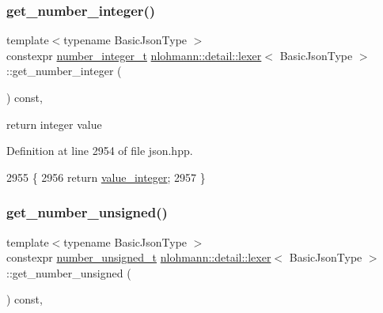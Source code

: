 \subsubsection{\texorpdfstring{get\+\_\+number\+\_\+integer()}{get\_number\_integer()}}
{\footnotesize\ttfamily template$<$typename Basic\+Json\+Type $>$ \\
constexpr \hyperlink{classnlohmann_1_1detail_1_1lexer_a9cd1b11cc67edbfb2613c788b5bd337c}{number\+\_\+integer\+\_\+t} \hyperlink{classnlohmann_1_1detail_1_1lexer}{nlohmann\+::detail\+::lexer}$<$ Basic\+Json\+Type $>$\+::get\+\_\+number\+\_\+integer (\begin{DoxyParamCaption}{ }\end{DoxyParamCaption}) const\hspace{0.3cm}{\ttfamily [inline]}, {\ttfamily [noexcept]}}



return integer value 



Definition at line 2954 of file json.\+hpp.


\begin{DoxyCode}
2955     \{
2956         \textcolor{keywordflow}{return} \hyperlink{classnlohmann_1_1detail_1_1lexer_a353d8eeca5b2f21b3e88540c17afb9bc}{value\_integer};
2957     \}
\end{DoxyCode}
\mbox{\label{classnlohmann_1_1detail_1_1lexer_a56640fb92293e0c17742ca3c814d74d6}} 
\subsubsection{\texorpdfstring{get\+\_\+number\+\_\+unsigned()}{get\_number\_unsigned()}}
{\footnotesize\ttfamily template$<$typename Basic\+Json\+Type $>$ \\
constexpr \hyperlink{classnlohmann_1_1detail_1_1lexer_a105d1dfeab414a572655895cdd96a52a}{number\+\_\+unsigned\+\_\+t} \hyperlink{classnlohmann_1_1detail_1_1lexer}{nlohmann\+::detail\+::lexer}$<$ Basic\+Json\+Type $>$\+::get\+\_\+number\+\_\+unsigned (\begin{DoxyParamCaption}{ }\end{DoxyParamCaption}) const\hspace{0.3cm}{\ttfamily [inline]}, {\ttfamily [noexcept]}}



